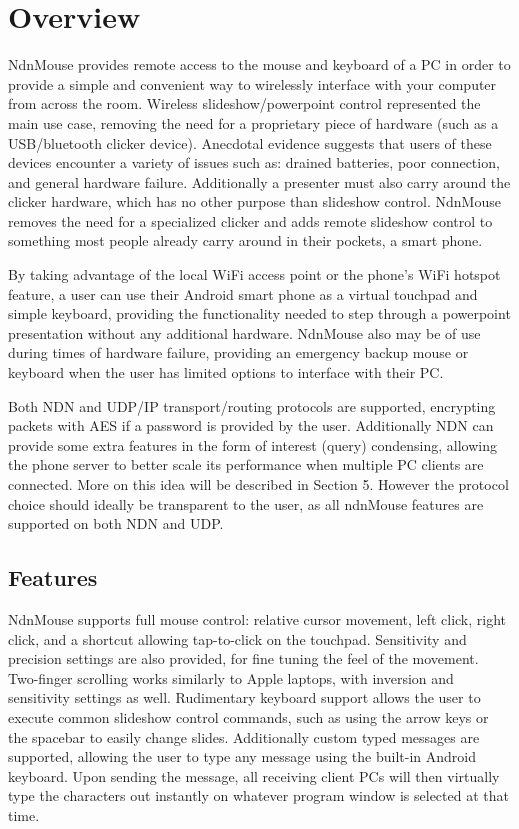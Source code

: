 \documentclass{sig-alternate}
\renewcommand\_{\textunderscore\allowbreak}  %
\begin{document}
\section{Overview}
NdnMouse provides remote access to the mouse and keyboard of a PC in order to provide a simple and convenient way to wirelessly interface with your computer from across the room. Wireless slideshow/powerpoint control represented the main use case, removing the need for a proprietary piece of hardware (such as a USB/bluetooth clicker device). Anecdotal evidence suggests that users of these devices encounter a variety of issues such as: drained batteries, poor connection, and general hardware failure. Additionally a presenter must also carry around the clicker hardware, which has no other purpose than slideshow control. NdnMouse removes the need for a specialized clicker and adds remote slideshow control to something most people already carry around in their pockets, a smart phone. 

By taking advantage of the local WiFi access point or the phone's WiFi hotspot feature, a user can use their Android smart phone as a virtual touchpad and simple keyboard, providing the functionality needed to step through a powerpoint presentation without any additional hardware. NdnMouse also may be of use during times of hardware failure, providing an emergency backup mouse or keyboard when the user has limited options to interface with their PC.

Both NDN and UDP/IP transport/routing protocols are supported, encrypting packets with AES if a password is provided by the user. Additionally NDN can provide some extra features in the form of interest (query) condensing, allowing the phone server to better scale its performance when multiple PC clients are connected. More on this idea will be described in Section 5. However the protocol choice should ideally be transparent to the user, as all ndnMouse features are supported on both NDN and UDP.

\subsection{Features}
NdnMouse supports full mouse control: relative cursor movement, left click, right click, and a shortcut allowing tap-to-click on the touchpad. Sensitivity and precision settings are also provided, for fine tuning the feel of the movement. Two-finger scrolling works similarly to Apple laptops, with inversion and sensitivity settings as well. Rudimentary keyboard support allows the user to execute common slideshow control commands, such as using the arrow keys or the spacebar to easily change slides. Additionally custom typed messages are supported, allowing the user to type any message using the built-in Android keyboard. Upon sending the message, all receiving client PCs will then virtually type the characters out instantly on whatever program window is selected at that time.
\end{document}
